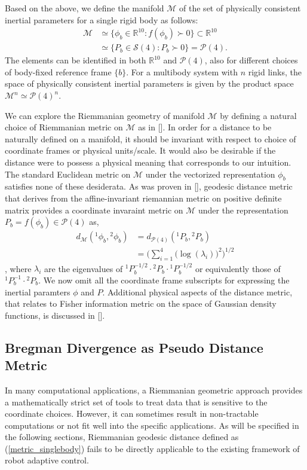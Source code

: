 \documentclass[Afour,sageh,times]{sagej}
\begin{document}
Based on the above, we define the manifold $\mathcal{M}$ of the set of physically consistent
inertial parameters for a single rigid body as follows:
\begin{align*}
\mathcal{M} &\simeq \{ \phi_{b} \in \mathbb{R}^{10} : f(\phi_{b}) \succ 0\}
\subset\mathbb{R}^{10}\nonumber\\
& \simeq \{ P_{b} \in \mathcal{S}(4) : P_{b} \succ 0\} = \mathcal{P}(4).
\end{align*}
The elements can be identified in both $\mathbb{R}^{10}$ and $\mathcal{P}(4)$, also
for different choices of body-fixed reference frame $\{b\}$. For a multibody system
with $n$ rigid links, the space of physically consistent inertial parameters is
given by the product space $\mathcal{M}^{n} \simeq \mathcal{P}(4)^{n}$.

We can explore the Riemmanian geometry of manifold $\mathcal{M}$ by defining a natural choice of Riemmanian metric on $\mathcal{M}$ as in []. In order for a distance to be naturally defined on a manifold, it should be invariant with respect to choice of coordinate frames or physical units/scale. It would also be desirable if the distance were to possess a physical meaning that corresponds to our intuition. The standard Euclidean metric on $\mathcal{M}$ under the vectorized representation $\phi_{b}$ satisfies none of these desiderata. As was proven in [], geodesic distance metric that derives from the affine-invariant riemannian metric on positive definite matrix provides a coordinate invaraint metric on $\mathcal{M}$ under the representation $P_{b}= f(\phi_{b})\in\mathcal{P}(4)$ as,
\begin{align}
d_{\mathcal{M}}({^{1}}\phi_{b}, {^{2}}\phi_{b})
&= d_{\mathcal{P}(4)}({^{1}}P_{b}, {^{2}}P_{b})
\label{metric_singlebody}\\
&= \bigg(\sum_{i=1}^{4}\big(\log(\lambda_{i})\big)^2\bigg)^{1/2}
\end{align}
, where $\lambda_i$ are the eigenvalues of ${^{1}}P_{b}^{-1/2}\cdot{^{2}}P_{b}\cdot{^{1}}P_{b}^{-1/2}$ or equivalently those of ${^{1}}P_{b}^{-1}\cdot{^{2}}P_{b}$. We now omit all the coordinate frame subscripts for expressing the inertial paramters $\phi$ and $P$. Additional physical aspects of the distance metric, that relates to Fisher information metric on the space of Gaussian density functions, is discussed in []. 
\subsection{Bregman Divergence as Pseudo Distance Metric}
In many computational applications, a Riemmanian geometric approach provides a mathematically strict set of tools to treat data that is sensitive to the coordinate choices. However, it can sometimes result in non-tractable computations or not fit well into the specific applications. As will be specified in the following sections, Riemmanian geodesic distance defined as (\ref{metric_singlebody}) fails to be directly applicable to the existing framework of robot adaptive control.
\end{document}

